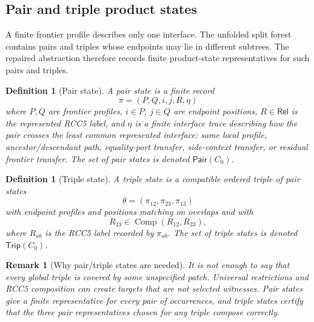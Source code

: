 \documentclass[11pt]{article}
\newtheorem{definition}[theorem]{Definition}
\newtheorem{remark}[theorem]{Remark}
\newcommand{\Rel}{\mathsf{Rel}}
\newcommand{\Comp}{\operatorname{Comp}}
\newcommand{\Pair}{\mathsf{Pair}}
\newcommand{\Trip}{\mathsf{Trip}}
\begin{document}
\subsection{Pair and triple product states}

A finite frontier profile describes only one interface.  The unfolded split forest contains pairs and triples whose endpoints may lie in different subtrees.  The repaired abstraction therefore records finite product-state representatives for such pairs and triples.

\begin{definition}[Pair state]
A pair state is a finite record
\[
  \pi=(P,Q,i,j,R,\eta)
\]
where $P,Q$ are frontier profiles, $i\in P$, $j\in Q$ are endpoint positions, $R\in\Rel$ is the represented RCC5 label, and $\eta$ is a finite interface trace describing how the pair crosses the least common represented interface: same local profile, ancestor/descendant path, equality-port transfer, side-context transfer, or residual frontier transfer.  The set of pair states is denoted $\Pair(C_0)$.
\end{definition}

\begin{definition}[Triple state]
A triple state is a compatible ordered triple of pair states
\[
  \theta=(\pi_{12},\pi_{23},\pi_{13})
\]
with endpoint profiles and positions matching on overlaps and with
\[
  R_{13}\in\Comp(R_{12},R_{23}),
\]
where $R_{ab}$ is the RCC5 label recorded by $\pi_{ab}$.  The set of triple states is denoted $\Trip(C_0)$.
\end{definition}

\begin{remark}[Why pair/triple states are needed]
It is not enough to say that every global triple is covered by some unspecified patch.  Universal restrictions and RCC5 composition can create targets that are not selected witnesses.  Pair states give a finite representative for every pair of occurrences, and triple states certify that the three pair representatives chosen for any triple compose correctly.
\end{remark}
\end{document}
